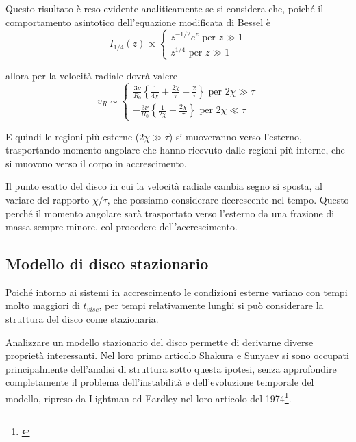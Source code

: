 \documentclass[a4paperbi]{article}
\begin{document}
	Questo risultato è reso evidente analiticamente se si considera che, poiché il comportamento asintotico dell'equazione modificata di Bessel è
	\begin{equation*}
		I_{1/4}(z)\propto\begin{cases}
				z^{-1/2}e^z\text{ per $z\gg1$}\\
				z^{1/4}\text{ per $z\gg1$}
			\end{cases}
	\end{equation*}
	 
	allora per la velocità radiale dovrà valere
	\begin{equation*}
		v_R\sim\begin{cases}
			\frac{3\nu}{R_0}\left\{\frac{1}{4\chi}+\frac{2\chi}{\tau}-\frac{2}{\tau}\right\}\text{ per $2\chi\gg\tau$}\\
			-\frac{3\nu}{R_0}\left\{\frac{1}{2\chi}-\frac{2\chi}{\tau}\right\}\text{ per $2\chi\ll\tau$}			
			\end{cases}
	\end{equation*}
	
	E quindi le regioni più esterne ($2\chi\gg\tau$) si muoveranno verso l'esterno, trasportando momento angolare che hanno ricevuto dalle regioni più interne, che si muovono verso il corpo in accrescimento.
	
	Il punto esatto del disco in cui la velocità radiale cambia segno si sposta, al variare del rapporto $\chi/\tau$, che possiamo considerare decrescente nel tempo. Questo perché il momento angolare sarà trasportato verso l'esterno da una frazione di massa sempre minore, col procedere dell'accrescimento.
	
\subsection{Modello di disco stazionario}
	Poiché intorno ai sistemi in accrescimento le condizioni esterne variano con tempi molto maggiori di $t_{visc}$, per tempi relativamente lunghi si può considerare la struttura del disco come stazionaria.
	
	Analizzare un modello stazionario del disco permette di derivarne diverse proprietà interessanti. Nel loro primo articolo Shakura e Sunyaev si sono occupati principalmente dell'analisi di struttura sotto questa ipotesi, senza approfondire completamente il problema dell'instabilità e dell'evoluzione temporale del modello, ripreso da Lightman ed Eardley nel loro articolo del 1974\footnote{\cite{LightmanEardley1974}}.
	
\end{document}
